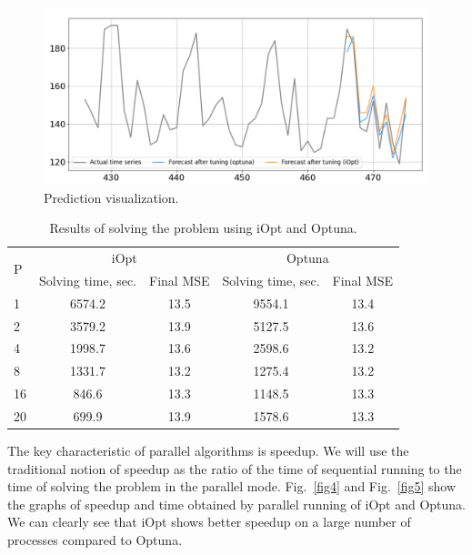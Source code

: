 \documentclass[runningheads]{llncs}
\begin{document}
\begin{figure}
\center
\includegraphics[width=1\textwidth]{fig3.png}
\caption{Prediction visualization.} \label{fig3}
\end{figure}

\begin{table}
\centering
\caption{Results of solving the problem using iOpt and Optuna.}\label{tab1}
\begin{tabular}{|l|c|c|c|c|}
\hline
\multirow{2}{*}{P} & \multicolumn{2}{c|}{iOpt} & \multicolumn{2}{c|}{Optuna} \\
\cline{2-5} 
 & Solving time, sec. & Final MSE & Solving time, sec. & Final MSE \\
\hline
1 & 6574.2 & 13.5 & 9554.1 & 13.4 \\
2 & 3579.2 & 13.9 & 5127.5 & 13.6 \\
4 & 1998.7 & 13.6 & 2598.6 & 13.2 \\
8 & 1331.7 & 13.2 & 1275.4 & 13.2 \\
16 & 846.6 & 13.3 & 1148.5 & 13.3 \\
20 & 699.9 & 13.9 & 1578.6 & 13.3 \\
\hline
\end{tabular}
\end{table}

The key characteristic of parallel algorithms is speedup. We will use the traditional notion of speedup as the ratio of the time of sequential running to the time of solving the problem in the parallel mode. Fig.~\ref{fig4} and Fig.~\ref{fig5} show the graphs of speedup and time obtained by parallel running of iOpt and Optuna. We can clearly see that iOpt shows better speedup on a large number of processes compared to Optuna.
\end{document}
